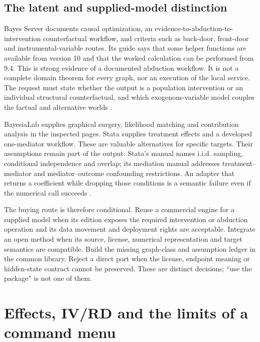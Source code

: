 \subsection{The latent and supplied-model distinction}

Bayes Server documents causal optimization, an evidence-to-abduction-to-
intervention counterfactual workflow, and criteria such as back-door, front-door
and instrumental-variable routes. Its guide says that some helper functions
are available from version 10 and that the worked calculation can be performed
from 9.4. This is strong evidence of a documented abduction workflow. It is
not a complete domain theorem for every graph, nor an execution of the local
service. The request must state whether the output is a population intervention
or an individual structural counterfactual, and which exogenous-variable model
couples the factual and alternative worlds
\citep{exec13_ci_bayesserver_causality}.

BayesiaLab supplies graphical surgery, likelihood matching and contribution
analysis in the inspected pages. Stata supplies treatment effects and a
developed one-mediator workflow. These are valuable alternatives for specific
targets. Their assumptions remain part of the output: Stata's manual names
i.i.d. sampling, conditional independence and overlap; its mediation manual
addresses treatment--mediator and mediator--outcome confounding restrictions.
An adapter that returns a coefficient while dropping those conditions is a
semantic failure even if the numerical call succeeds
\citep{exec13_ci_bayesia_surgery,exec13_ci_bayesia_matching,
exec13_ci_stata_causal_intro,exec13_ci_stata_mediate}.

The buying route is therefore conditional. Reuse a commercial engine for a
supplied model when its edition exposes the required intervention or abduction
operation and its data movement and deployment rights are acceptable. Integrate
an open method when its source, license, numerical representation and target
semantics are compatible. Build the missing graph-class and assumption ledger
in the common library. Reject a direct port when the license, endpoint meaning
or hidden-state contract cannot be preserved. These are distinct decisions;
``use the package'' is not one of them.

\section{Effects, IV/RD and the limits of a command menu}
\label{exec17:s8-effects}

